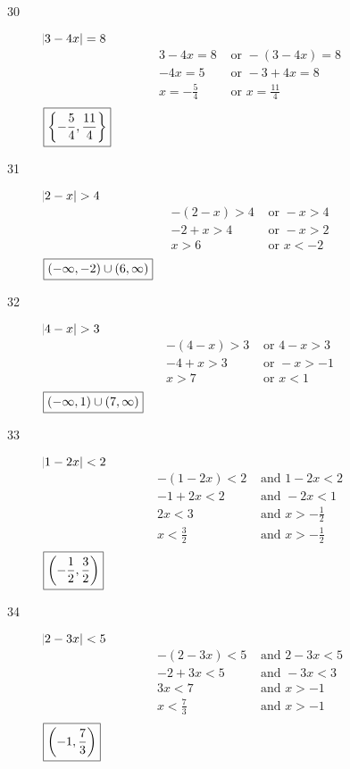\documentclass[letterpaper, landscape]{exam}
\begin{document}
    \begin{description}

      \item[30]
        $\abs{ 3 - 4x } = 8$
        \begin{align*}
          3 - 4x = 8        & \text{ or } -(3 - 4x) = 8 \\
           -4x = 5          & \text{ or } -3 + 4x = 8 \\
           x = -\frac{5}{4} & \text{ or } x = \frac{11}{4} \\
        \end{align*}
        $\boxed{ \cbr{- \frac{5}{4}, \frac{11}{4} } }$

      \item[31]
        $ \abs{ 2 - x } > 4$
        \begin{align*}
          -(2 - x) > 4 & \text{ or } - x > 4 \\
          -2 + x > 4   & \text{ or } -x > 2 \\
          x > 6        & \text{ or } x < -2 \\
        \end{align*}
        $\boxed{ \intoo{ -\infty, -2 } \cup \intoo{ 6, \infty } }$

      \item[32]
        $\abs{ 4 - x } > 3$
        \begin{align*}
          -(4 - x) > 3 & \text{ or } 4 - x > 3 \\
          -4 + x > 3   & \text{ or } -x > -1 \\
          x > 7        & \text{ or } x < 1 \\
        \end{align*}
        $\boxed{ \intoo{ -\infty, 1 } \cup \intoo{ 7, \infty } }$

      \item[33]
        $\abs{ 1 - 2x } < 2$
        \begin{align*}
          -(1 - 2x) < 2   & \text{ and } 1 - 2x < 2 \\
          -1 + 2x < 2     & \text{ and } -2x < 1 \\
          2x < 3          & \text{ and } x > - \frac{1}{2} \\
          x < \frac{3}{2} & \text{ and } x > - \frac{1}{2} \\
        \end{align*}
        $\boxed{ \intoo{ - \frac{1}{2}, \frac{3}{2} } }$

      \item[34]
        $\abs{ 2 - 3x } < 5$
        \begin{align*}
          -(2 - 3x) < 5   & \text{ and } 2 - 3x < 5 \\
          -2 + 3x < 5     & \text{ and } -3x < 3 \\
          3x < 7          & \text{ and } x > -1 \\
          x < \frac{7}{3} & \text{ and } x > -1 \\
        \end{align*}
        $\boxed{ \intoo{ -1, \frac{7}{3} } }$


\end{description}
\end{document}
